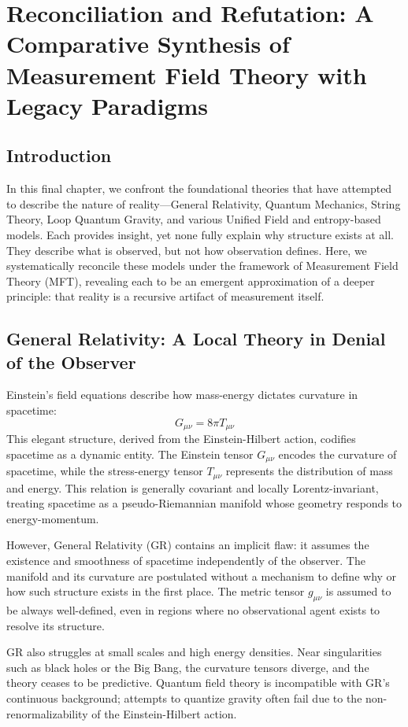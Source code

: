 \chapter{Reconciliation and Refutation: A Comparative Synthesis of Measurement Field Theory with Legacy Paradigms}

\section{Introduction}
In this final chapter, we confront the foundational theories that have attempted to describe the nature of reality—General Relativity, Quantum Mechanics, String Theory, Loop Quantum Gravity, and various Unified Field and entropy-based models. Each provides insight, yet none fully explain why structure exists at all. They describe what is observed, but not how observation defines. Here, we systematically reconcile these models under the framework of Measurement Field Theory (MFT), revealing each to be an emergent approximation of a deeper principle: that reality is a recursive artifact of measurement itself.

\section{General Relativity: A Local Theory in Denial of the Observer}
Einstein’s field equations describe how mass-energy dictates curvature in spacetime:
\[
G_{\mu\nu} = 8\pi T_{\mu\nu}
\]
This elegant structure, derived from the Einstein-Hilbert action, codifies spacetime as a dynamic entity. The Einstein tensor \(G_{\mu\nu}\) encodes the curvature of spacetime, while the stress-energy tensor \(T_{\mu\nu}\) represents the distribution of mass and energy. This relation is generally covariant and locally Lorentz-invariant, treating spacetime as a pseudo-Riemannian manifold whose geometry responds to energy-momentum.

However, General Relativity (GR) contains an implicit flaw: it assumes the existence and smoothness of spacetime independently of the observer. The manifold and its curvature are postulated without a mechanism to define why or how such structure exists in the first place. The metric tensor \(g_{\mu\nu}\) is assumed to be always well-defined, even in regions where no observational agent exists to resolve its structure.

GR also struggles at small scales and high energy densities. Near singularities such as black holes or the Big Bang, the curvature tensors diverge, and the theory ceases to be predictive. Quantum field theory is incompatible with GR's continuous background; attempts to quantize gravity often fail due to the non-renormalizability of the Einstein-Hilbert action.

